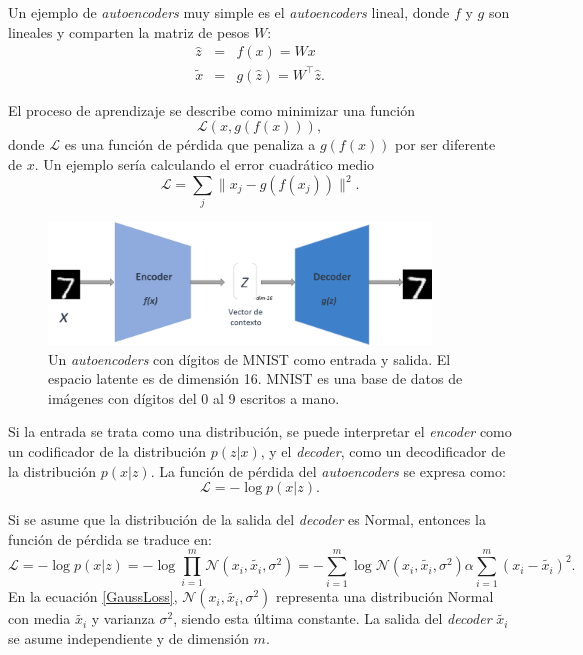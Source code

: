 Un ejemplo de \textit{autoencoders} muy simple es el \textit{autoencoders} lineal, donde $f$ y $g$ son lineales y comparten la matriz de pesos $W$:
\begin{eqnarray*}
	\hat{z} &=& f(x) = Wx \\
	\tilde{x} &=& g(\hat{z}) = W^{\top}\hat{z}.
\end{eqnarray*}

El proceso de aprendizaje se describe como minimizar una función
\begin{equation}
	\mathcal{L}(x, g(f(x))),
\end{equation}
donde $	\mathcal{L}$ es una función de pérdida que penaliza a $g(f(x))$ por ser diferente de $x$. Un ejemplo sería calculando el error cuadrático medio
\begin{equation*}
\mathcal{L}	= \sum_{j}\parallel x_j - g(f(x_j)) \parallel^{2}.
\end{equation*}

\begin{figure}[!h]
	
	\centering
	\includegraphics[width=4in]{Graphics/AEMnist.png}
	
	\caption{\small{Un \textit{autoencoders} con dígitos de MNIST como entrada y salida. El espacio latente es de dimensión 16. MNIST es una base de datos de imágenes con dígitos del 0 al 9 escritos a mano.}}
	
	\label{AEminist}

	
\end{figure}

Si la entrada se trata como una distribución, se puede interpretar el \textit{encoder} como un codificador de la distribución $p(z|x)$, y el \textit{decoder}, como un decodificador de la distribución $p(x|z)$. La función de pérdida del \textit{autoencoders} se expresa como:
\begin{equation}
	\mathcal{L} = - \log p(x|z).
\end{equation}

Si se asume que la distribución de la salida del \textit{decoder} es Normal, entonces la función de pérdida se traduce en:
\begin{equation}
	\label{GaussLoss}
	\mathcal{L} = -\log p(x|z) = -\log \prod_{i = 1}^{m}\mathcal{N}(x_i, \tilde{x_i}, \sigma^{2}) = -\sum_{i=1}^{m}\log\mathcal{N}(x_i, \tilde{x_i}, \sigma^{2})\alpha\sum_{i = 1}^{m}(x_i - \tilde{x_i})^{2}.
\end{equation}
En la ecuación \ref{GaussLoss}, $\mathcal{N}(x_i, \tilde{x_i}, \sigma^{2})$ representa una distribución Normal con media $\tilde{x_i}$ y varianza $\sigma^{2}$, siendo esta última constante. La salida del \textit{decoder} $\tilde{x_i}$ se asume independiente y de dimensión $m$.

